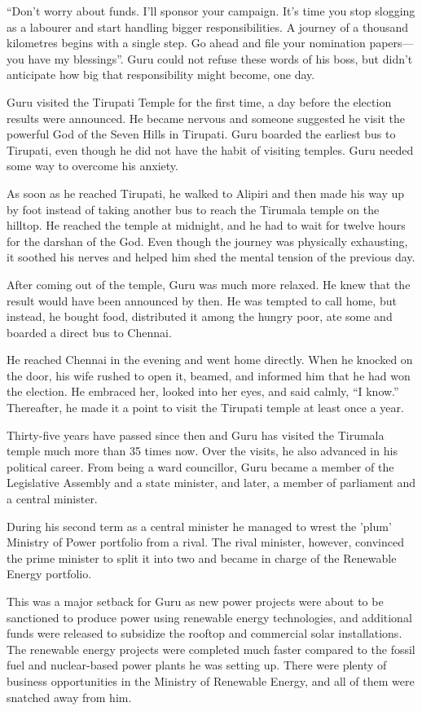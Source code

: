 “Don't worry about funds. I'll sponsor your campaign. It's time you stop
slogging as a labourer and start handling bigger responsibilities. A journey of
a thousand kilometres begins with a single step. Go ahead and file your
nomination papers—you have my blessings”. Guru could not refuse these words of
his boss, but didn't anticipate how big that responsibility might become, one
day.

Guru visited the Tirupati Temple for the first time, a day before the election
results were announced. He became nervous and someone suggested he visit the
powerful God of the Seven Hills in Tirupati. Guru boarded the earliest bus to
Tirupati, even though he did not have the habit of visiting temples. Guru needed
some way to overcome his anxiety.

As soon as he reached Tirupati, he walked to Alipiri and then made his way up by
foot instead of taking another bus to reach the Tirumala temple on the hilltop.
He reached the temple at midnight, and he had to wait for twelve hours for the
darshan of the God. Even though the journey was physically exhausting, it
soothed his nerves and helped him shed the mental tension of the previous day.

After coming out of the temple, Guru was much more relaxed. He knew that the
result would have been announced by then. He was tempted to call home, but
instead, he bought food, distributed it among the hungry poor, ate some and
boarded a direct bus to Chennai.

He reached Chennai in the evening and went home directly. When he knocked on the
door, his wife rushed to open it, beamed, and informed him that he had won the
election. He embraced her, looked into her eyes, and said calmly, “I know.”
Thereafter, he made it a point to visit the Tirupati temple at least once a
year.

Thirty-five years have passed since then and Guru has visited the Tirumala
temple much more than 35 times now. Over the visits, he also advanced in his
political career. From being a ward councillor, Guru became a member of the
Legislative Assembly and a state minister, and later, a member of parliament and
a central minister.

During his second term as a central minister he managed to wrest the 'plum'
Ministry of Power portfolio from a rival.  The rival minister, however,
convinced the prime minister to split it into two and became in charge of the
Renewable Energy portfolio.

This was a major setback for Guru as new power projects were about to be
sanctioned to produce power using renewable energy technologies, and additional
funds were released to subsidize the rooftop and commercial solar installations.
The renewable energy projects were completed much faster compared to the
fossil fuel and nuclear-based power plants he was setting up. There were plenty of
business opportunities in the Ministry of Renewable Energy, and all of them were
snatched away from him.

